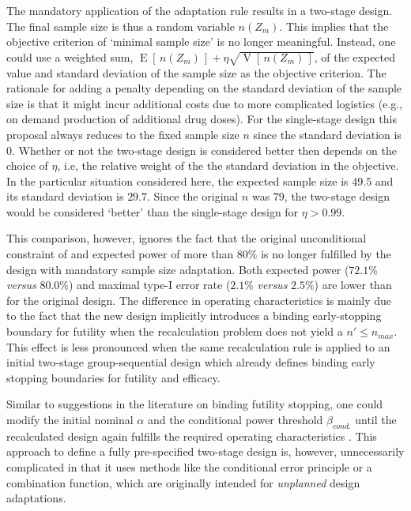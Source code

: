 \documentclass{article}
\newcommand{\E}{\ensuremath{\operatorname{E}}}
\newcommand{\V}{\operatorname{V}}
\begin{document}
The mandatory application of the adaptation rule
results in a two-stage design.
The final sample size is thus a random variable $n(Z_m)$.
This implies that the objective criterion of `minimal sample size' is no longer meaningful.
Instead, one could use a weighted sum, $\E[\,n(Z_m)\,] + \eta \sqrt{\V[\,n(Z_m)\,]}$, of the expected value and standard deviation of the sample size as the objective criterion.
The rationale for adding a penalty depending on the standard deviation of the sample size is that it might incur additional costs due to more
complicated logistics (e.g., on demand production of additional drug doses).
For the single-stage design this proposal always reduces to the fixed sample size $n$ since the standard deviation is 0. 
Whether or not the two-stage design is considered better then depends on the choice of $\eta$, 
i.e, the relative weight of the the standard deviation in the objective.
In the particular situation considered here, the expected sample size is $49.5$ and its standard deviation is $29.7$.
Since the original $n$ was $79$, the two-stage
design would be considered `better'
than the single-stage design for $\eta>0.99$.

This comparison, however, ignores the fact that
the original unconditional constraint of and expected power of more than $80\%$
is no longer fulfilled by the design with mandatory
sample size adaptation.
Both expected power ($72.1\%$ \emph{versus} $80.0\%$) and maximal type-I error rate ($2.1\%$ \emph{versus} $2.5\%$) are lower than for the original design.
The difference in operating characteristics is mainly due to the fact
that the new design implicitly introduces a binding early-stopping boundary for futility
when the recalculation problem does not yield a $n'\leq n_{max}$.
This effect is less pronounced when the same recalculation rule is applied 
to an initial two-stage group-sequential design 
which already defines binding early stopping boundaries 
for futility and efficacy.

Similar to suggestions in the literature on binding futility stopping, 
one could modify the initial nominal $\alpha$ and the conditional power threshold $\beta_{cond.}$ until the recalculated design again fulfills the required 
operating characteristics \citep{brannath2004}. 
This approach to define a fully pre-specified two-stage design is, however, unnecessarily complicated in that it 
uses methods like the conditional error principle or a combination function, which are originally intended for \emph{unplanned}
design adaptations.
\end{document}
